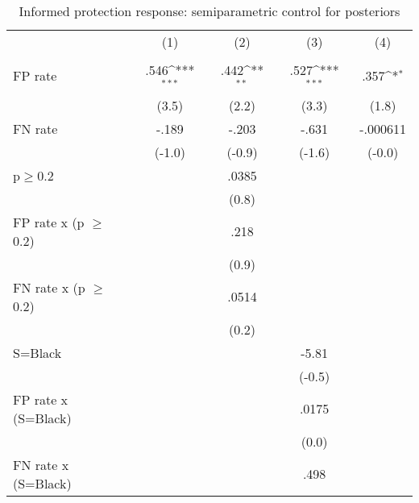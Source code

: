 \begin{table}[htbp]\centering
\def\sym#1{\ifmmode^{#1}\else\(^{#1}\)\fi}
\caption{Informed protection response: semiparametric control for posteriors}
\begin{tabular}{l*{4}{c}}
\hline\hline
                &\multicolumn{1}{c}{(1)}&\multicolumn{1}{c}{(2)}&\multicolumn{1}{c}{(3)}&\multicolumn{1}{c}{(4)}\\
                &\multicolumn{1}{c}{}&\multicolumn{1}{c}{}&\multicolumn{1}{c}{}&\multicolumn{1}{c}{}\\
\hline
FP rate         &     .546\sym{***}&     .442\sym{**} &     .527\sym{***}&     .357\sym{*}  \\
                &    (3.5)         &    (2.2)         &    (3.3)         &    (1.8)         \\
FN rate         &    -.189         &    -.203         &    -.631         & -.000611         \\
                &   (-1.0)         &   (-0.9)         &   (-1.6)         &   (-0.0)         \\
p$\geq$0.2      &                  &    .0385         &                  &                  \\
                &                  &    (0.8)         &                  &                  \\
FP rate x (p $\geq$ 0.2)&                  &     .218         &                  &                  \\
                &                  &    (0.9)         &                  &                  \\
FN rate x (p $\geq$ 0.2)&                  &    .0514         &                  &                  \\
                &                  &    (0.2)         &                  &                  \\
S=Black         &                  &                  &    -5.81         &                  \\
                &                  &                  &   (-0.5)         &                  \\
FP rate x (S=Black)&                  &                  &    .0175         &                  \\
                &                  &                  &    (0.0)         &                  \\
FN rate x (S=Black)&                  &                  &     .498         &                  \\

\end{tabular}
\end{table}
